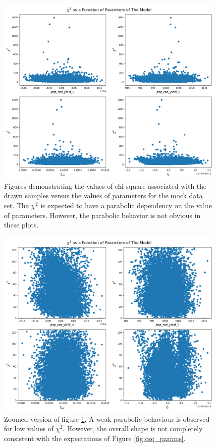 \documentclass[12pt, TexShade, letterpaper]{report}
\begin{document}
\begin{figure}[h!]
\centering
\includegraphics[scale =0.5]{csq_vs_params_known_curve.png}
\caption[Chi-Square of Drawn samples as a function of parameter values for the mock data]{Figures demonstrating the values of chi-square associated with the drawn samples versus the values of parameters for the mock data set. The $\chi^2$ is
expected to have a parabolic dependency on the value of parameters. However, the parabolic behavior is not obvious in these plots.}
\label{fig:csq_vs_params_knwon_curve}
\end{figure}

\begin{figure}[h!]
\centering
\includegraphics[scale =0.5]{csq_vs_params_zoomed_known_curve.png}
\caption[Chi-Square of Drawn samples as a function of parameter values for the mock data, zoomed version]{Zoomed version of figure \ref{fig:csq_vs_params_knwon_curve}, A weak parabolic behaviour is observed for low values of $\chi^2$. However, the overall shape is not completely consistent with the expectations of Figure \ref{fig:csq_params}.}
\label{fig:csq_vs_params_zoomed_known_curve}
\end{figure}
\end{document}
